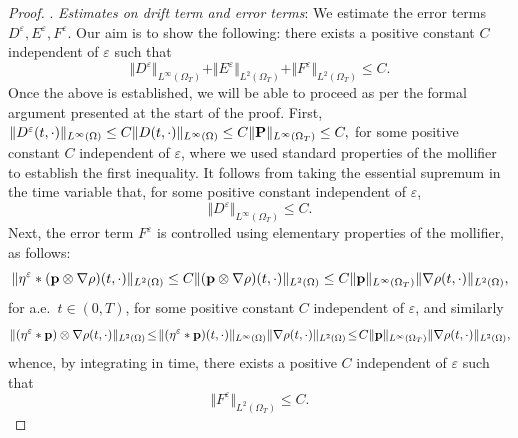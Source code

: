 \documentclass[11pt,a4paper,reqno]{amsart}
\theoremstyle{remark}
\theoremstyle{definition}
\numberwithin{equation}{section}
\renewcommand{\P}{{\bf P}}
\newcommand{\p}{{\bf p}}
\begin{document}
\begin{proof}
    \smallskip 

    . \textit{Estimates on drift term and error terms}: We estimate the error terms $D^\varepsilon, E^\varepsilon, F^\varepsilon$. Our aim is to show the following: there exists a positive constant $C$ independent of $\varepsilon$ such that 
    \begin{equation}\label{eq:unif bounds for H1 for p with mollifications}
        \Vert D^\varepsilon \Vert_{L^\infty(\Omega_T)} + \Vert E^\varepsilon \Vert_{L^2(\Omega_T)} + \Vert F^\varepsilon \Vert_{L^2(\Omega_T)} \leq C. 
    \end{equation}
    Once the above is established, we will be able to proceed as per the formal argument presented at the start of the proof. First, $\Vert D^\varepsilon (t,\cdot) \Vert_{L^\infty(\Omega)} \leq C \Vert D(t,\cdot) \Vert_{L^\infty(\Omega)} \leq C \Vert \P \Vert_{L^\infty(\Omega_T)} \leq C,$ for some positive constant $C$ independent of $\varepsilon$, where we used standard properties of the mollifier to establish the first inequality. It follows from taking the essential supremum in the time variable that, for some positive constant independent of $\varepsilon$, 
    \begin{equation}\label{eq:first error term H1 proof p}
        \Vert D^\varepsilon \Vert_{L^\infty(\Omega_T)} \leq C. 
    \end{equation}
Next, the error term $F^\varepsilon$ is controlled using elementary properties of the mollifier, as follows: 
\begin{equation*}
    \Vert \eta^\varepsilon*(\p \otimes \nabla \rho)(t,\cdot) \Vert_{L^2(\Omega)} \leq C \Vert (\p \otimes \nabla \rho) (t,\cdot) \Vert_{L^2(\Omega)} \leq C \Vert \p \Vert_{L^\infty(\Omega_T)} \Vert \nabla \rho(t,\cdot) \Vert_{L^2(\Omega)}, 
\end{equation*}
for a.e.~$t \in(0,T)$, for some positive constant $C$ independent of $\varepsilon$, and similarly 
\begin{equation*}
    \Vert (\eta^\varepsilon*\p )\otimes \nabla \rho (t,\cdot) \Vert_{L^2(\Omega)} \!\leq\! \Vert (\eta^\varepsilon*\p )(t,\cdot) \Vert_{L^\infty(\Omega)}\Vert \nabla \rho(t,\cdot) \Vert_{L^2(\Omega)} \!\leq\! C \Vert \p \Vert_{L^\infty(\Omega_T)} \Vert \nabla \rho(t,\cdot) \Vert_{L^2(\Omega)}, 
\end{equation*}
whence, by integrating in time, there exists a positive $C$ independent of $\varepsilon$ such that 
\begin{equation}\label{eq:second error term H1 proof p}
    \Vert F^\varepsilon \Vert_{L^2(\Omega_T)} \leq C. 

\end{equation}
\end{proof}
\end{document}

